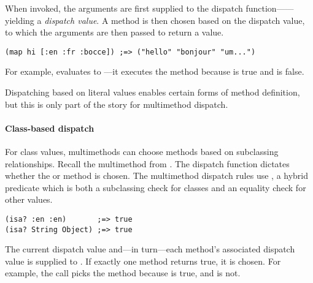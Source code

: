 When invoked, the arguments are first supplied to the dispatch function------yielding
a \emph{dispatch value}. A method is then chosen
based on the dispatch value, to which the arguments are then passed to return a value.
%
\begin{lstlisting}
(map hi [:en :fr :bocce]) ;=> ("hello" "bonjour" "um...")
\end{lstlisting}
%
For example, 
 evaluates to ---it executes
the  method
because  is true
and  is false.

Dispatching based on literal values enables certain forms of method
definition, but this is only part of the story for multimethod dispatch.

\paragraph{Class-based dispatch}
For class values, multimethods can choose methods based on subclassing
relationships.
%
Recall the multimethod from . %
%
The dispatch function 
dictates 
whether the  or  method is chosen.
%
The multimethod dispatch rules use
, a hybrid predicate which is both a subclassing check for classes and
an equality check for other values.

\begin{lstlisting}
(isa? :en :en)       ;=> true
(isa? String Object) ;=> true
\end{lstlisting}
%
The current dispatch value and---in turn---each method's associated dispatch value
is supplied to . If exactly one method returns true, it is chosen.
%
For example,
the call
picks the  method because 
is true, and
is not.
%

